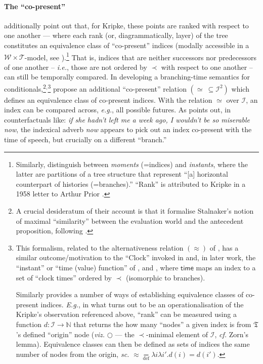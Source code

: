 \documentclass[11pt,dvipsnames]{report}
\begin{document}
\paragraph{The ``co-present''} \citet{Øhrstrøm2020} additionally point out that, for Kripke, these points are ranked with respect to one another --- where each rank (or, diagrammatically, layer) of the tree constitutes an equivalence class of ``co-present'' indices (modally accessible in a $ \mathcal{W\times T }$-model, see \citealp*[95]{Kaufmann2006}).\footnote{Similarly, \citet[194\textit{ff}]{Belnap2001a} distinguish between \textit{moments} (=indices) and \textit{instants}, where the latter are partitions of a tree structure that represent ``[a] horizontal counterpart of histories (=branches).'' ``Rank'' is attributed to Kripke in a 1958 letter to Arthur Prior \citep[published in][373\textit{ff}]{Ploug2012}.} 
That is, indices that are neither successors nor predecessors of one another -- \textit{i.e.}, those are not ordered by $ \prec $ with respect to one another -- can still be temporally compared. In developing a branching-time semantics for conditionals,\footnote{A crucial desideratum of their account is that it formalise Stalnaker's notion of maximal ``similarity'' between the evaluation world and the antecedent proposition, following \citealp{Stalnaker1968,Stalnaker1970}.}$ ^, $\footnote{This formalism, related to the alternativeness relation $ (\approx )$ of \citet[149]{Thomason1984}, has a similar outcome/motivation to the ``Clock'' invoked in \citet{Dowty1977,Thomason1981} and, in later work, the ``instant'' or ``time (value) function'' of \citet[27]{Rumberg2016a}, \citet[195]{Belnap2001a} and \citet[592]{VonPrince2019}, where $ \mathit{\mathsf{time}}$ maps an index to a set of ``clock times'' ordered by $ \prec $ (isomorphic to branches).
	
	Similarly \citet[102]{Landman1991} provides a number of ways of establishing equivalence classes of co-present indices. \textit{E.g.}, in what turns out to be an operationalisation of the Kripke's observation referenced above, ``rank'' can be measured using a function $ d:\mathcal I\to\mathbb N $ that returns the how many ``nodes'' a given index is from $ \mathfrak T $'s defined ``origin'' node (\textit{viz.} $ \bigcirc $ --- the $ \prec $-minimal element of $ \mathcal I $, \textit{cf.} Zorn's lemma). Equivalence classes can then be defined as sets of indices the same number of nodes from the origin, \textit{sc. }$ \approx\underset{\text{def}}{=}\lambda i\lambda i'.d(i)=d(i') $.} 
\cite{Thomason1980} propose an additional ``co-present'' relation $( \boldsymbol\simeq\ \subseteq\mathcal I^2) $ which defines an equivalence class of co-present indices. With the relation $ \simeq $ over $ \mathcal I $, an index can be compared across, \textit{e.g.}, all possible futures. As \citet[101]{Landman1991} points out, in counterfactuals like: \textit{if she hadn't left me a week ago, I wouldn't be so miserable now}, the indexical adverb \textit{now} appears to pick out an index co-present with the time of speech, but crucially on a different ``branch.'' %
\end{document}
